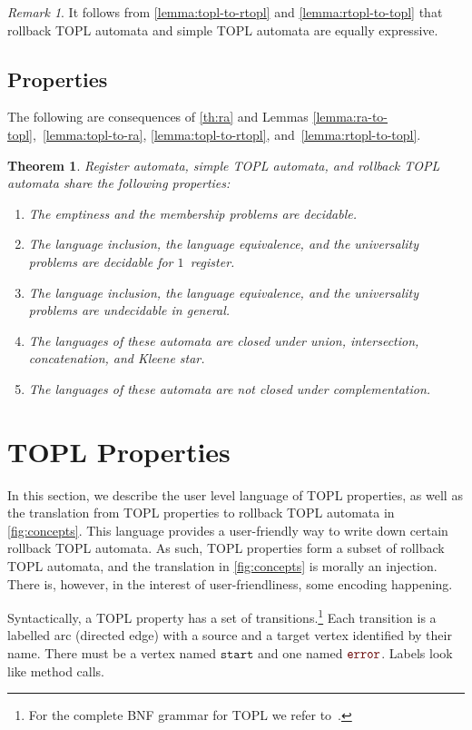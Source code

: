 \documentclass{article} %
\newcommand{\error}{\ensuremath{\textcolor{darkred}{\mathtt{error}}}\xspace}
\newcommand{\start}{\ensuremath{\mathtt{start}}\xspace}
\newtheorem{theorem}{Theorem}
\theoremstyle{definition}
\theoremstyle{remark}
\newtheorem{remark}{Remark}
\begin{document}
\begin{remark}
It follows from \autoref{lemma:topl-to-rtopl} and \autoref{lemma:rtopl-to-topl} that rollback TOPL automata and simple TOPL automata are equally expressive.
\end{remark}

\subsection{Properties} %

The following are consequences of \autoref{th:ra} and Lemmas \ref{lemma:ra-to-topl},~\ref{lemma:topl-to-ra}, \ref{lemma:topl-to-rtopl}, and~\ref{lemma:rtopl-to-topl}.

\begin{theorem}\label{th:main}
Register automata, simple TOPL automata, and rollback TOPL automata share the following properties:
\begin{enumerate}
\item The emptiness and the membership problems are decidable.
\item The language inclusion, the language equivalence, and the universality problems are decidable for $1$~register.
\item The language inclusion, the language equivalence, and the universality problems are undecidable in general.
\item The languages of these automata are closed under union, intersection, concatenation, and Kleene star.
\item The languages of these automata are not closed under complementation.
\end{enumerate}
\end{theorem}

\section{TOPL Properties}\label{sec:topl} %

In this section, we describe the user level language of TOPL
properties, as well as the translation from TOPL properties to
rollback TOPL automata in \autoref{fig:concepts}.
%
This language provides a user-friendly way to write down certain
rollback TOPL automata.
As such, TOPL properties form a subset of rollback TOPL
automata, and the translation in \autoref{fig:concepts} is morally an
injection. There is, however, in the interest of user-friendliness,
some encoding happening.

Syntactically, a TOPL property has a set of transitions.\footnote{For
  the complete BNF grammar for TOPL we refer to~\cite{our-fool2011}.}
Each transition is a labelled arc (directed edge) with a source and a
target vertex identified by their name.
There must be a vertex named \start and one named \error.
Labels look like method calls.
\end{document}
